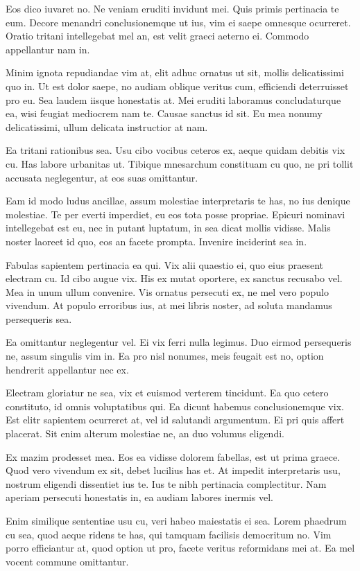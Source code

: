 Eos dico iuvaret no. Ne veniam eruditi invidunt mei. Quis primis pertinacia te eum. Decore menandri conclusionemque ut ius, vim ei saepe omnesque ocurreret. Oratio tritani intellegebat mel an, est velit graeci aeterno ei. Commodo appellantur nam in.

Minim ignota repudiandae vim at, elit adhuc ornatus ut sit, mollis delicatissimi quo in. Ut est dolor saepe, no audiam oblique veritus cum, efficiendi deterruisset pro eu. Sea laudem iisque honestatis at. Mei eruditi laboramus concludaturque ea, wisi feugiat mediocrem nam te. Causae sanctus id sit. Eu mea nonumy delicatissimi, ullum delicata instructior at nam.

Ea tritani rationibus sea. Usu cibo vocibus ceteros ex, aeque quidam debitis vix cu. Has labore urbanitas ut. Tibique mnesarchum constituam cu quo, ne pri tollit accusata neglegentur, at eos suas omittantur.

Eam id modo ludus ancillae, assum molestiae interpretaris te has, no ius denique molestiae. Te per everti imperdiet, eu eos tota posse propriae. Epicuri nominavi intellegebat est eu, nec in putant luptatum, in sea dicat mollis vidisse. Malis noster laoreet id quo, eos an facete prompta. Invenire inciderint sea in.

Fabulas sapientem pertinacia ea qui. Vix alii quaestio ei, quo eius praesent electram cu. Id cibo augue vix. His ex mutat oportere, ex sanctus recusabo vel. Mea in unum ullum convenire. Vis ornatus persecuti ex, ne mel vero populo vivendum. At populo erroribus ius, at mei libris noster, ad soluta mandamus persequeris sea.

Ea omittantur neglegentur vel. Ei vix ferri nulla legimus. Duo eirmod persequeris ne, assum singulis vim in. Ea pro nisl nonumes, meis feugait est no, option hendrerit appellantur nec ex.

Electram gloriatur ne sea, vix et euismod verterem tincidunt. Ea quo cetero constituto, id omnis voluptatibus qui. Ea dicunt habemus conclusionemque vix. Est elitr sapientem ocurreret at, vel id salutandi argumentum. Ei pri quis affert placerat. Sit enim alterum molestiae ne, an duo volumus eligendi.

Ex mazim prodesset mea. Eos ea vidisse dolorem fabellas, est ut prima graece. Quod vero vivendum ex sit, debet lucilius has et. At impedit interpretaris usu, nostrum eligendi dissentiet ius te. Ius te nibh pertinacia complectitur. Nam aperiam persecuti honestatis in, ea audiam labores inermis vel.

Enim similique sententiae usu cu, veri habeo maiestatis ei sea. Lorem phaedrum cu sea, quod aeque ridens te has, qui tamquam facilisis democritum no. Vim porro efficiantur at, quod option ut pro, facete veritus reformidans mei at. Ea mel vocent commune omittantur.

